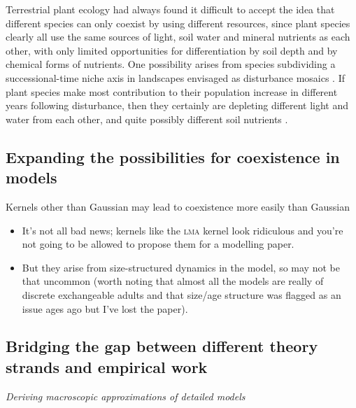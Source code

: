 \documentclass[a4paper,11pt]{article}
\begin{document}
Terrestrial plant ecology had always found it difficult to accept the idea
that different species can only coexist by using different resources, since
plant species clearly all use the same sources of light, soil water and
mineral nutrients as each other, with only limited opportunities for
differentiation by soil depth and by chemical forms of nutrients. One
possibility arises from species subdividing a successional-time niche axis in
landscapes envisaged as disturbance mosaics \citep{Connell-1978}. If plant
species make most contribution to their population increase in different years
following disturbance, then they certainly are depleting different light and
water from each other, and quite possibly different soil nutrients
\citep{Moorcroft-2001}.


\subsection{Expanding the possibilities for coexistence in models}

Kernels other than Gaussian may lead to coexistence more easily
  than Gaussian

\begin{itemize}
\item It's not all bad news; kernels like the \textsc{lma} kernel look
  ridiculous and you're not going to be allowed to propose them for
  a modelling paper.
\item But they arise from size-structured dynamics in the model, so
  may not be that uncommon (worth noting that almost all the models
  are really of discrete exchangeable adults and that size/age
  structure was flagged as an issue ages ago but I've lost the
  paper).
\end{itemize}


\subsection{Bridging the gap between different theory strands and 
empirical work}

\textit{Deriving macroscopic approximations of detailed models}
\end{document}
